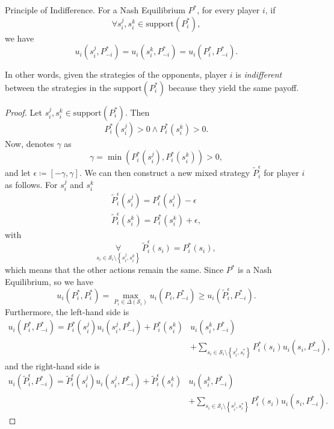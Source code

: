 \begin{theorem}
	Principle of Indifference. For a Nash Equilibrium \(P^{\ast}\), for every player \(i\), if
	\[
		\forall s_{i}^j, s_{i}^k\in \text{support}(P_{i}^{\ast}),
	\]
	we have
	\[
		u_{i}(s_{i}^j, P_{-i}^{\ast}) = u_{i}(s_{i}^k, P_{-i}^{\ast}) = u_{i}(P_{i}^*, P_{-i}^{\ast}).
	\]
\end{theorem}
\begin{intuition}
	In other words, given the strategies of the opponents, player \(i\) is \emph{indifferent} between the strategies in the \(\mathrm{support}(P_{i}^{\ast}) \)
	because they yield the same payoff.
\end{intuition}
\begin{proof}
	Let \(s_{i}^j, s_{i}^k\in \mathrm{support}(P_i^{\ast}) \). Then
	\[
		P_i^{\ast}(s_{i}^j)>0\land P_i^{\ast}(s_{i}^k)>0.
	\]
	Now, denotes \(\gamma\) as
	\[
		\gamma = \min\left(P_i^{\ast}(s_{i}^j), P_i^{\ast}(s_{i}^k)\right)>0,
	\]
	and let \(\epsilon\coloneqq \left[-\gamma, \gamma\right]\). We can then construct a new mixed strategy \(\widetilde{P}_{i}^{\epsilon}\)
	for player \(i\) as follows. For \(s_{i}^j\) and \(s_{i}^k\)
	\[
		\begin{split}
			\widetilde{P}_{i}^{\epsilon}(s_{i}^j) = P_i^{\ast}(s_{i}^j)- \epsilon\\
			\widetilde{P}_{i}^{\epsilon}(s_{i}^k) = P_i^{\ast}(s_{i}^k)+\epsilon,
		\end{split}
	\]
	with
	\[
		\underset{s_{i}\in \mathcal{S}_{i}\setminus\left\{s_{i}^j, s_{i}^k\right\}}{\forall} \ \widetilde{P}_{i}^{\epsilon}(s_{i}) = P_i^{\ast}(s_{i}),
	\]
	which means that the other actions remain the same. Since \(P^{\ast}\) is a Nash Equilibrium, so we have
	\[
		u_{i}\left(P^{\ast}_i, P_{i}^{\ast}\right) = \max_{P_{i}\in \Delta(\mathcal{S}_{i})} u_{i}(P_{i}, P_{-i}^{\ast}) \geq u_{i}(\widetilde{P}_{i}^{\epsilon}, P_{-i}^{\ast}).
	\]
	Furthermore, the left-hand side is
	\[
		\begin{split}
			u_{i}\left(P^{\ast}_i, P_{-i}^{\ast}\right) = P_{i}^{\ast}(s_{i}^j)u_{i}(s_{i}^j, P^{\ast}_{-i}) + P^{\ast}_{i}(s_{i}^{k})&u_{i}(s_{i}^{k}, P^{\ast}_{-i})\\
			&+ \sum\limits_{ s_{i}\in \mathcal{S}_{i}\setminus\left\{s_{i}^j, s_{i}^*\right\}} P^{\ast}_{i}(s_{i})u_{i}(s_{i}, P^{\ast}_{-i}),
		\end{split}
	\]
	and the right-hand side is
	\[
		\begin{split}
			u_{i}\left(\widetilde{P}^{\epsilon}_i, P_{-i}^{\ast}\right) = \widetilde{P}_{i}^{\epsilon}(s_{i}^j)u_{i}(s_{i}^j, P^{\ast}_{-i}) + \widetilde{P}^{\epsilon}_{i}(s_{i}^{k})&u_{i}(s_{i}^{k}, P^{\ast}_{-i})\\
			&+ \sum\limits_{ s_{i}\in \mathcal{S}_{i}\setminus\left\{s_{i}^j, s_{i}^*\right\}} P^{\ast}_{i}(s_{i})u_{i}(s_{i}, P^{\ast}_{-i}).
		\end{split}
	\]


\end{proof}
